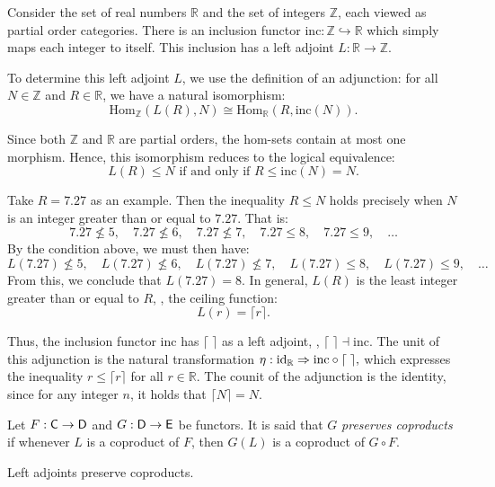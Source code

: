 \begin{example}
  Consider the set of real numbers $\mathbb{R}$ and the set of integers $\mathbb{Z}$, each viewed as partial order categories. There is an inclusion functor $\mathrm{inc} : \mathbb{Z} \hookrightarrow \mathbb{R}$ which simply maps each integer to itself.  This inclusion has a left adjoint $L : \mathbb{R} \to \mathbb{Z}$. 

To determine this left adjoint $L$, we use the definition of an adjunction:  for all $N \in \mathbb{Z}$ and $R \in \mathbb{R}$, we have a natural isomorphism:
\[
\mathrm{Hom}_{\mathbb{Z}}(L(R), N) \cong \mathrm{Hom}_{\mathbb{R}}(R, \mathrm{inc}(N)).
\]

Since both $\mathbb{Z}$ and $\mathbb{R}$ are partial orders, the hom-sets contain at most one morphism. Hence, this isomorphism reduces to the logical equivalence:
\[
 L(R) \leq N \text{ if and only if } R \leq \mathrm{inc}(N) = N.
\]

Take $R = 7.27$ as an example. Then the inequality $R \leq N$ holds precisely when $N$ is an integer greater than or equal to $7.27$. That is:
\[
7.27 \nleq 5,\quad 7.27 \nleq 6,\quad 7.27 \nleq 7,\quad 7.27 \leq 8,\quad 7.27 \leq 9, \quad \ldots
\]
By the condition above, we must then have:
\[
L(7.27) \nleq 5,\quad L(7.27) \nleq 6,\quad L(7.27) \nleq 7,\quad L(7.27) \leq 8,\quad L(7.27) \leq 9, \quad \ldots
\]
From this, we conclude that $L(7.27) = 8$. In general, $L(R)$ is the least integer greater than or equal to $R$, \ie, the ceiling function:
\[
L(r) = \lceil r \rceil.
\]

Thus, the inclusion functor $\mathrm{inc}$ has $\lceil \; \rceil$ as a left adjoint, \ie, $\lceil  \; \rceil \dashv \mathrm{inc}$.
The unit of this adjunction is the natural transformation
$\eta : \mathrm{id}_{\mathbb{R}} \Rightarrow \mathrm{inc} \circ \lceil  \;  \rceil,$
which expresses the inequality $r \leq \lceil r \rceil$ for all $r \in \mathbb{R}$. The counit of the adjunction is the identity, since for any integer $n$, it holds that $\lceil N \rceil = N$.
\end{example}



\begin{definition}
  Let \( F: \mathsf{C} \to \mathsf{D} \) and \( G:  \mathsf{D} \to  \mathsf{E} \) be functors. It is said that \( G \)  \emph{preserves coproducts} if  whenever $ L $ is a coproduct of \( F \), then \( G(L) \) is a coproduct of \( G \circ F \).
\end{definition}

\begin{theorem}
 Left adjoints preserve coproducts.
\end{theorem}

